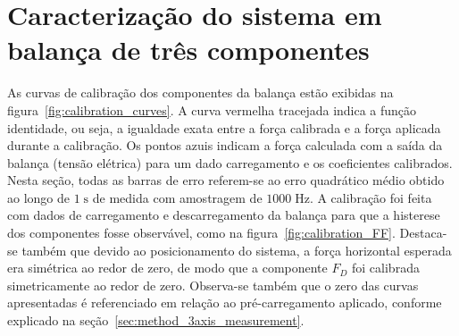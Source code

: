 \section{Caracterização do sistema em balança de três componentes}\label{sec:result_characterization}

As curvas de calibração dos componentes da balança estão exibidas na figura~\ref{fig:calibration_curves}. A curva vermelha tracejada indica a função identidade, ou seja, a igualdade exata entre a força calibrada e a força aplicada durante a calibração. Os pontos azuis indicam a força calculada com a saída da balança (tensão elétrica) para um dado carregamento e os coeficientes calibrados. Nesta seção, todas as barras de erro referem-se ao erro quadrático médio obtido ao longo de \(1\;\mathrm{s}\) de medida com amostragem de \(1000\;\mathrm{Hz}\). A calibração foi feita com dados de carregamento e descarregamento da balança para que a histerese dos componentes fosse observável, como na figura~\ref{fig:calibration_FF}. Destaca-se também que devido ao posicionamento do sistema, a força horizontal esperada era simétrica ao redor de zero, de modo que a componente \(F_D\) foi calibrada simetricamente ao redor de zero. Observa-se também que o zero das curvas apresentadas é referenciado em relação ao pré-carregamento aplicado, conforme explicado na seção~\ref{sec:method_3axis_measurement}.

